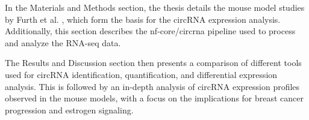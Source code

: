 In the Materials and Methods section, the thesis details the mouse model
studies by Furth et al.
\supercite{furth_esr1_2023,furth_overexpression_2023},
which form the basis for the circRNA expression
analysis.
Additionally, this section describes the nf-core/circrna
pipeline\supercite{digby_nf-corecircrna_2023} used to process and analyze the
RNA-seq data.

The Results and Discussion section then presents a comparison of different
tools used for circRNA identification, quantification, and differential
expression analysis.
This is followed by an in-depth analysis of circRNA expression profiles
observed in the mouse models, with a focus on the implications for breast
cancer progression and estrogen signaling.
